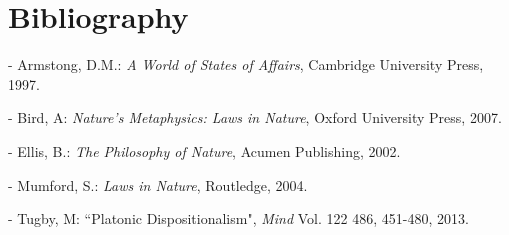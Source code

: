 \documentclass[12pt]{article}
\begin{document}
\section{Bibliography}

- Armstong, D.M.: \textit{A World of States of Affairs}, Cambridge University Press, 1997.
\par \noindent \newline
- Bird, A: \textit{Nature's Metaphysics: Laws in Nature}, Oxford University Press, 2007.
\par \noindent \newline
- Ellis, B.: \textit{The Philosophy of Nature}, Acumen Publishing, 2002.
\par \noindent \newline
- Mumford, S.: \textit{Laws in Nature}, Routledge, 2004.
\par \noindent \newline
- Tugby, M: ``Platonic Dispositionalism", \textit{Mind} Vol. 122 486, 451-480, 2013.
\end{document}
